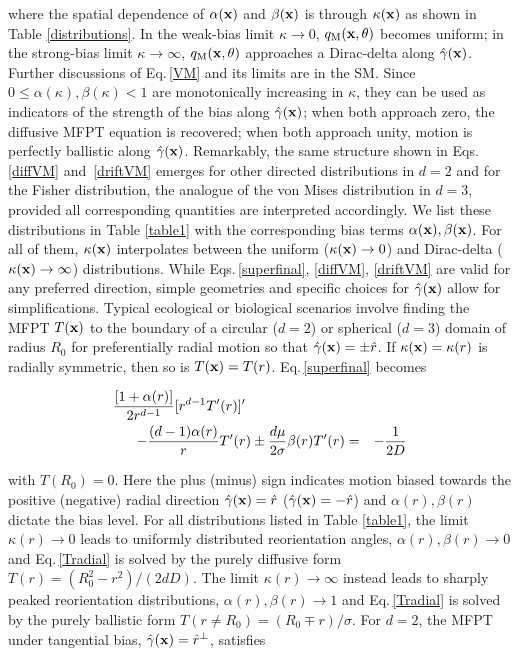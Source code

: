 \documentclass[
 reprint,










 amsmath,amssymb,
 aps, prl,






longbibliography
]{revtex4-2}
\begin{document}
\noindent
where the spatial dependence of $\alpha({\bf {x}})$ and $\beta({\bf {x}})$
is through $\kappa ({\bf {x}})$ as shown in Table \ref{distributions}.
In the weak-bias limit $\kappa \to 0$, $q_{\rm M}  ({\bf {x}},  \theta)$ becomes uniform;
in the strong-bias limit $\kappa \to \infty$, $q_{\rm M}  ({\bf {x}},  \theta)$ approaches a Dirac-delta
along $\hat \gamma({\bf {x}})$.  Further discussions of Eq.\,\ref{VM} and its
limits are in the SM. Since $0 \leq \alpha(\kappa), \beta(\kappa) < 1$ are monotonically increasing in $\kappa$,
they can be used as indicators of
 the strength of the bias along $\hat \gamma ({\bf {x}})$;
when both approach zero, the diffusive MFPT equation is recovered;
when both approach unity, motion is perfectly ballistic along $\hat \gamma ({\bf {x}})$.
Remarkably, the same structure shown in Eqs.\,\ref{diffVM} and \,\ref{driftVM}
emerges for other directed distributions in $d=2$ and
for the Fisher distribution, the analogue of the von Mises distribution in $d=3$, provided all corresponding quantities
are interpreted accordingly.
We list these distributions in Table \ref{table1} with the corresponding bias terms $\alpha({\bf {x}}), \beta({\bf {x}})$.
For all of them, $\kappa(\bf x)$ interpolates between the uniform ($\kappa({\bf x}) \to 0$)
and Dirac-delta ($\kappa({\bf x}) \to \infty$) distributions.
While Eqs.\,\ref{superfinal}, \ref{diffVM}, \ref{driftVM} are
valid for any preferred direction,
simple geometries and specific choices for $ \hat{\gamma} ({\bf {x}})$
allow for simplifications. Typical ecological or biological
scenarios involve finding the MFPT $T({\bf {x}})$
to the boundary of a circular ($d=2$) or spherical ($d=3$) domain
of radius $R_0$ for preferentially radial motion
so that $\hat \gamma({\bf {x}}) =\pm \hat r$.
If $\kappa({\bf {x}}) = \kappa (r)$ is radially symmetric, then so is
$T({\bf {x}}) = T(r)$.
Eq.\,\ref{superfinal}
becomes

\begin{eqnarray}
\nonumber
\frac{[1 + \alpha(r)]}{2  r^{d-1}} [r^ {d-1} T'(r)]'  \hspace{2.5cm}  \\
 -  \frac{ (d-1) \alpha(r)}{ r} T'(r)
\pm \frac{d \mu}{2 \sigma} \beta(r) T'(r)
&=& - \frac{1}{2 D}
\label{Tradial}
\end{eqnarray}

with $T(R_0) = 0$. Here the plus (minus) sign indicates motion biased towards the positive (negative) radial direction
$\hat \gamma({\bf {x}}) = \hat r$ ($\hat \gamma({\bf {x}}) = - \hat r$) and $\alpha(r), \beta(r)$ dictate the
bias level. For all distributions listed in
Table \ref{table1}, the limit $\kappa(r) \to 0$
leads to uniformly distributed reorientation angles, $\alpha(r), \beta(r) \to 0$ and Eq.\,\ref{Tradial} is solved by the purely diffusive form
$T(r) =(R_0^2 - r^2)/ (2 d D)$. The limit $\kappa(r) \to \infty$ instead
leads to sharply peaked reorientation
distributions,  $\alpha(r), \beta(r) \to 1$ and Eq.\,\ref{Tradial} is solved by the purely ballistic form
$T(r \neq R_0) = (R _0 \mp r)/ \sigma$.
For $d=2$, the MFPT under
tangential bias,  $\hat \gamma({\bf {x}}) = \hat r^{\perp}$, satisfies
\end{document}
